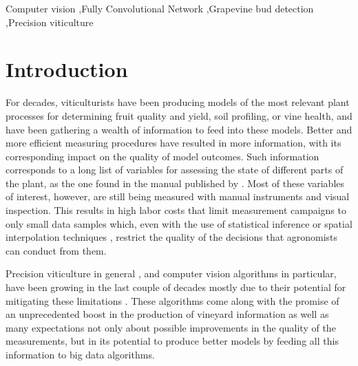 \documentclass[a4paper,authoryear,review]{elsarticle}
\begin{document}
\begin{frontmatter}
		\begin{keyword}
			Computer vision \sep Fully Convolutional Network \sep Grapevine bud detection \sep Precision viticulture
		\end{keyword}
	\end{frontmatter}
	
	\linenumbers
	
	
	
	\section{Introduction}
	
	For decades, viticulturists have been producing models of the most relevant plant processes for determining fruit quality and yield, soil profiling, or vine health, and have been gathering a wealth of information to feed into these models. Better and more efficient measuring procedures have resulted in more information, with its corresponding impact on the quality of model outcomes. 
	Such information corresponds to a long list of variables for assessing the state of different parts of the plant, as the one found in the manual published by \cite{awriNDmanual1, awriNDmanual3}.
	Most of these variables of interest, however, are still being measured with manual instruments and visual inspection. This results in high labor costs that limit measurement campaigns to only small data samples which, even with the use of statistical inference or spatial interpolation techniques \citep{whelan1996spatial}, restrict the quality of the decisions that agronomists can conduct from them.
	
	
	Precision viticulture in general \citep{bramley2009lessons}, and computer vision algorithms in particular, have been growing in the last couple of decades mostly due to their potential for mitigating these limitations \citep{seng2018computer, matese2015technology}. These algorithms come along with the promise of an unprecedented boost in the production of vineyard information as well as many expectations not only about possible improvements in the quality of the measurements, but in its potential to produce better models by feeding all this information to big data algorithms. 
	
\end{document}
